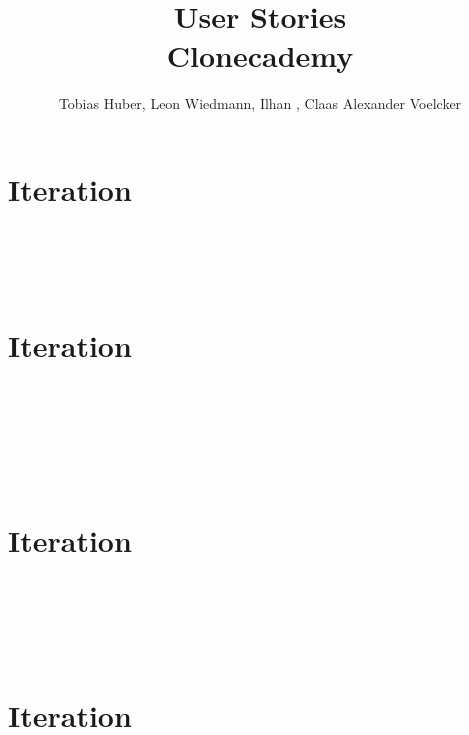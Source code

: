 \documentclass
[english,accentcolor=tud1c]
{tudreport}
\title{User Stories\\Clonecademy}
\author{Tobias Huber, Leon Wiedmann, Ilhan , Claas Alexander Voelcker}
\begin{document}

	\maketitle
	\tableofcontents


	\chapter{Iteration}

	 \\
	 \\
	 \\


	\chapter{Iteration}

	 \\
	 \\
	 \\
	 \\
	\\


	\chapter{Iteration}

	\\
	\\
	\\
	\\

	\chapter{Iteration}
\end{document}
